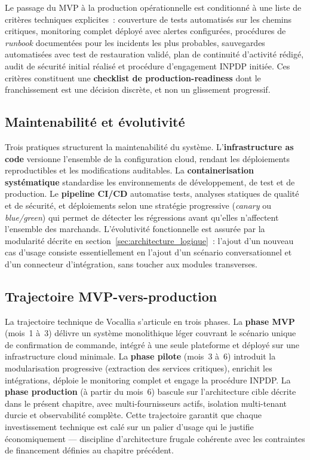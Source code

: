 Le passage du MVP à la production opérationnelle est conditionné à une liste de critères techniques explicites~: couverture de tests automatisés sur les chemins critiques, monitoring complet déployé avec alertes configurées, procédures de \emph{runbook} documentées pour les incidents les plus probables, sauvegardes automatisées avec test de restauration validé, plan de continuité d'activité rédigé, audit de sécurité initial réalisé et procédure d'engagement INPDP initiée. Ces critères constituent une \textbf{checklist de production-readiness} dont le franchissement est une décision discrète, et non un glissement progressif.

\subsection{Maintenabilité et évolutivité}
\label{subsec:deploiement_maintenance}

Trois pratiques structurent la maintenabilité du système. L'\textbf{infrastructure as code} versionne l'ensemble de la configuration cloud, rendant les déploiements reproductibles et les modifications auditables. La \textbf{containerisation systématique} standardise les environnements de développement, de test et de production. Le \textbf{pipeline CI/CD} automatise tests, analyses statiques de qualité et de sécurité, et déploiements selon une stratégie progressive (\emph{canary} ou \emph{blue/green}) qui permet de détecter les régressions avant qu'elles n'affectent l'ensemble des marchands. L'évolutivité fonctionnelle est assurée par la modularité décrite en section~\ref{sec:architecture_logique}~: l'ajout d'un nouveau cas d'usage consiste essentiellement en l'ajout d'un scénario conversationnel et d'un connecteur d'intégration, sans toucher aux modules transverses.

\subsection{Trajectoire MVP-vers-production}
\label{subsec:deploiement_mvp}

La trajectoire technique de Vocallia s'articule en trois phases. La \textbf{phase MVP} (mois~1 à~3) délivre un système monolithique léger couvrant le scénario unique de confirmation de commande, intégré à une seule plateforme et déployé sur une infrastructure cloud minimale. La \textbf{phase pilote} (mois~3 à~6) introduit la modularisation progressive (extraction des services critiques), enrichit les intégrations, déploie le monitoring complet et engage la procédure INPDP. La \textbf{phase production} (à partir du mois~6) bascule sur l'architecture cible décrite dans le présent chapitre, avec multi-fournisseurs actifs, isolation multi-tenant durcie et observabilité complète. Cette trajectoire garantit que chaque investissement technique est calé sur un palier d'usage qui le justifie économiquement — discipline d'architecture frugale cohérente avec les contraintes de financement définies au chapitre précédent.

